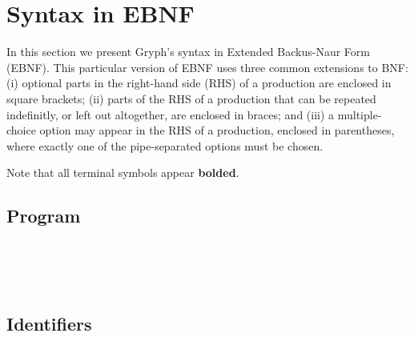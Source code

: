 \section{Syntax in EBNF}
\label{sec:ebnf}
In this section we present Gryph's syntax in Extended Backus-Naur Form (EBNF). This particular version of EBNF uses three common extensions to BNF: (i) optional parts in the right-hand side (RHS) of a production are enclosed in square brackets; (ii) parts of the RHS of a production that can be repeated indefinitly, or left out altogether, are enclosed in braces; and (iii) a multiple-choice option may appear in the RHS of a production, enclosed in parentheses, where exactly one of the pipe-separated options must be chosen.

Note that all terminal symbols appear \textbf{bolded}.
\subsection{Program}
\begin{bnf*}
    \\
    \\
    \\
\end{bnf*}

\subsection{Identifiers}
\begin{bnf*}
    \\
    \\
    \\
    \\
    \\
    \\
    \\
    \\
\end{bnf*}

